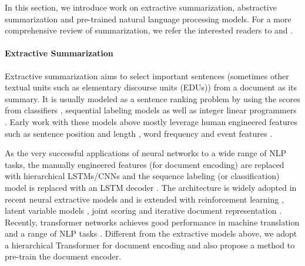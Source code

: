 \documentclass[11pt,a4paper]{article}
\begin{document}
In this section, we introduce work on extractive summarization, abstractive summarization and pre-trained natural language processing models. For a more comprehensive review of summarization, we refer the interested readers to  and .
\paragraph{Extractive Summarization} Extractive summarization aims to select important sentences (sometimes other textual units such as elementary discourse units (EDUs)) from a document as its summary. It is usually modeled as a sentence ranking problem by using the scores from classifiers \cite{kupiec:1995:sigir}, sequential labeling models \cite{conroy:2001:sigir} as well as integer linear programmers \cite{woodsend:2010:acl}. Early work with these models above mostly leverage human engineered features such as sentence position and length \cite{radev:2004}, word frequency \cite{nenkova:2006:sigir} and event features \cite{filatova2004event}. 

As the very successful applications of neural networks to a wide range of NLP tasks, the manually engineered features (for document encoding) are replaced with hierarchical LSTMs/CNNs and the sequence labeling (or classification) model is replaced with an LSTM decoder \cite{cheng:2016:acl,nallapati:2017:aaai}. The architecture is widely adopted in recent neural extractive models and is extended with reinforcement learning \cite{Narayan:ea:2018,dong:2018:emnlp}, latent variable models \cite{zhang:2018:emnlp}, joint scoring \cite{zhou:2018:acl} and iterative document representation \cite{chen:2018:emnlp}. Recently, transformer networks \cite{vaswani:2017:nips} achieves good performance in machine translation \cite{vaswani:2017:nips} and a range of NLP tasks \cite{devlin:2018:arxiv,radford:2018:nips}. Different from the extractive models above, we adopt a hierarchical Transformer for document encoding and also propose a method to pre-train the document encoder.
\end{document}
